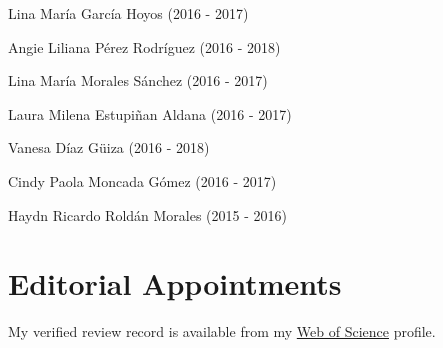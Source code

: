 \documentclass[11pt,a4paper,]{awesome-cv}
\begin{document}
\begin{cventries}
{\begin{cvitems}
\item Lina María García Hoyos  (2016 - 2017)
\item Angie Liliana Pérez Rodríguez  (2016 - 2018)
\item Lina María Morales Sánchez (2016 - 2017)
\item Laura Milena Estupiñan Aldana  (2016 - 2017)
\item Vanesa Díaz Güiza  (2016 - 2018)
\item Cindy Paola Moncada Gómez (2016 - 2017)
\item Haydn Ricardo Roldán Morales (2015 - 2016)
\end{cvitems}}
\end{cventries}

\hypertarget{editorial-appointments}{%
\section{Editorial Appointments}\label{editorial-appointments}}

My verified review record is available from my
\href{https://www.webofscience.com/wos/author/record/387716}{Web of
Science} profile.
\end{document}
